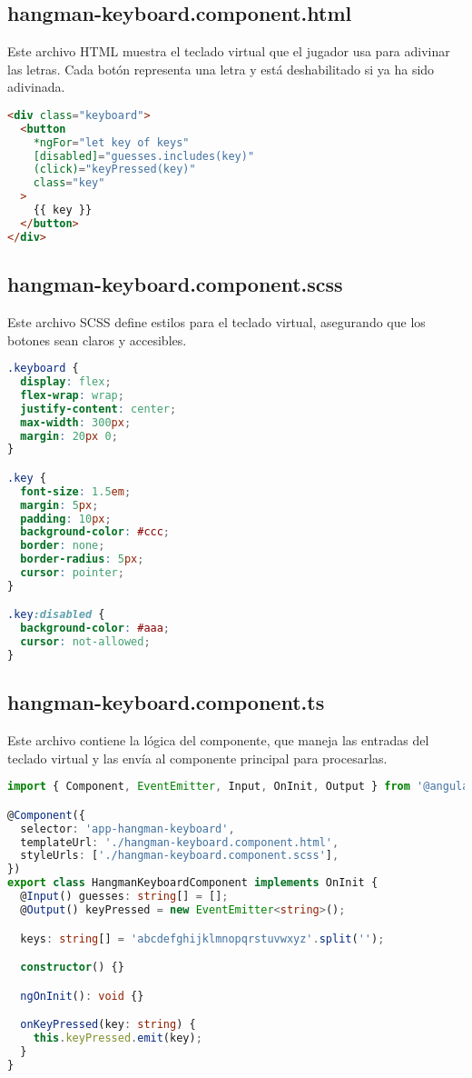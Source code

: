 \subsection{hangman-keyboard.component.html}

Este archivo HTML muestra el teclado virtual que el jugador usa para adivinar las letras. Cada botón representa una letra y está deshabilitado si ya ha sido adivinada.

\begin{lstlisting}[language=HTML]
<div class="keyboard">
  <button
    *ngFor="let key of keys"
    [disabled]="guesses.includes(key)"
    (click)="keyPressed(key)"
    class="key"
  >
    {{ key }}
  </button>
</div>
\end{lstlisting}

\subsection{hangman-keyboard.component.scss}

Este archivo SCSS define estilos para el teclado virtual, asegurando que los botones sean claros y accesibles.

\begin{lstlisting}[language=CSS]
.keyboard {
  display: flex;
  flex-wrap: wrap;
  justify-content: center;
  max-width: 300px;
  margin: 20px 0;
}

.key {
  font-size: 1.5em;
  margin: 5px;
  padding: 10px;
  background-color: #ccc;
  border: none;
  border-radius: 5px;
  cursor: pointer;
}

.key:disabled {
  background-color: #aaa;
  cursor: not-allowed;
}
\end{lstlisting}

\subsection{hangman-keyboard.component.ts}

Este archivo contiene la lógica del componente, que maneja las entradas del teclado virtual y las envía al componente principal para procesarlas.

\begin{lstlisting}[language=TypeScript]
import { Component, EventEmitter, Input, OnInit, Output } from '@angular/core';

@Component({
  selector: 'app-hangman-keyboard',
  templateUrl: './hangman-keyboard.component.html',
  styleUrls: ['./hangman-keyboard.component.scss'],
})
export class HangmanKeyboardComponent implements OnInit {
  @Input() guesses: string[] = [];
  @Output() keyPressed = new EventEmitter<string>();

  keys: string[] = 'abcdefghijklmnopqrstuvwxyz'.split('');

  constructor() {}

  ngOnInit(): void {}

  onKeyPressed(key: string) {
    this.keyPressed.emit(key);
  }
}
\end{lstlisting}


